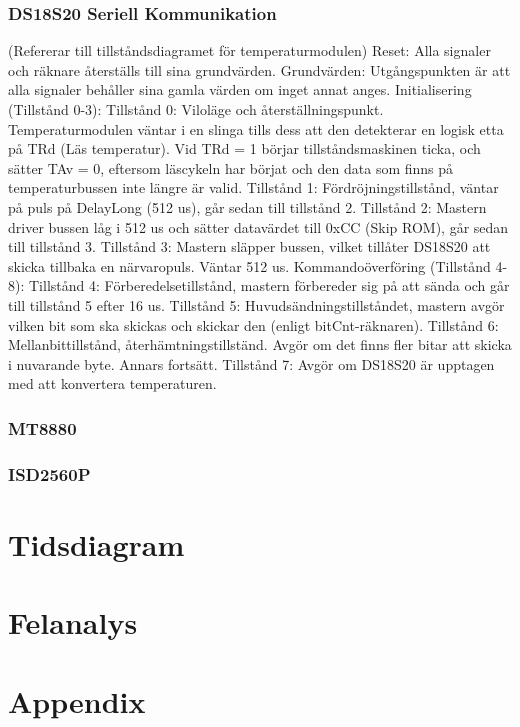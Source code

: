 \documentclass[a4paper,11pt]{article}
\begin{document}
		\subsubsection{DS18S20 Seriell Kommunikation}
			(Refererar till tillståndsdiagramet för temperaturmodulen)
			Reset: Alla signaler och räknare återställs till sina grundvärden.
			Grundvärden: Utgångspunkten är att alla signaler behåller sina gamla värden om inget annat anges.
			Initialisering (Tillstånd 0-3):
				Tillstånd 0: Viloläge och återställningspunkt. Temperaturmodulen väntar i en slinga tills
						dess att den detekterar en logisk etta på TRd (Läs temperatur).
						Vid TRd = 1 börjar tillståndsmaskinen ticka, och sätter TAv = 0,
						eftersom läscykeln har börjat och den data som finns på temperaturbussen
						inte längre är valid.
				Tillstånd 1: Fördröjningstillstånd, väntar på puls på DelayLong (512 us), går sedan till tillstånd 2.
				Tillstånd 2: Mastern driver bussen låg i 512 us och sätter datavärdet till 0xCC (Skip ROM), går sedan till tillstånd 3.
				Tillstånd 3: Mastern släpper bussen, vilket tillåter DS18S20 att skicka tillbaka en närvaropuls. Väntar 512 us.
			Kommandoöverföring (Tillstånd 4-8):
				Tillstånd 4: Förberedelsetillstånd, mastern förbereder sig på att sända och går till tillstånd 5 efter 16 us.
				Tillstånd 5: Huvudsändningstillståndet, mastern avgör vilken bit som ska skickas och skickar den (enligt bitCnt-räknaren).
				Tillstånd 6: Mellanbittillstånd, återhämtningstillständ. Avgör om det finns fler bitar att skicka i nuvarande byte. Annars fortsätt.
				Tillstånd 7: Avgör om DS18S20 är upptagen med att konvertera temperaturen.

		\subsubsection{MT8880}
		\subsubsection{ISD2560P}

\section{Tidsdiagram}

\section{Felanalys}

\section{Appendix}
\end{document}
